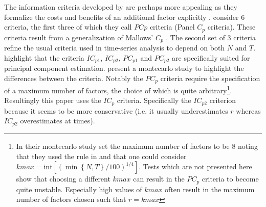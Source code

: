 \documentclass[11pt]{article}
\begin{document}
The information criteria developed by \citet{bai2002determining} are perhaps more appealing as they formalize the costs and benefits of an additional factor explicitly \citep{stock2011dynamic}. \citet{bai2002determining} consider $6$ criteria, the first three of which they call $PCp$ criteria (Panel $C_p$ criteria). These criteria result from a generalization of Mallows' $C_p$ \citep{mallows1973some}. The second set of $3$ criteria refine the usual criteria used in time-series analysis to depend on both $N$ and $T$. \citet{bai2002determining} highlight that the criteria $IC_{p1}$, $IC_{p2}$, $PC_{p1}$ and $PC_{p2}$ are specifically suited for principal component estimation. \citet{bai2002determining} present a montecarlo study to highlight the differences between the criteria. Notably the $PC_{p}$ criteria require the specification of a maximum number of factors, the choice of which is quite arbitrary\footnote{In their montecarlo study \citet{bai2002determining} set the maximum number of factors to be $8$ noting that they used the rule in \citet{schwert2002tests} and that one could consider $kmax=\text{int}[(\min\left\{N, T\right\}/100)^{1/4}]$. Tests which are not presented here show that choosing a different $kmax$ can result in the $PC_p$ criteria to become quite unstable. Especially high values of $kmax$ often result in the maximum number of factors chosen such that $r=kmax$}. Resultingly this paper uses the $IC_p$ criteria. Specifically the $IC_{p2}$ criterion because it seems to be more conservative (i.e. it usually underestimates $r$ whereas $IC_{p2}$ overestimates at times). 
\end{document}
